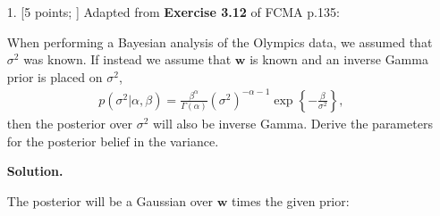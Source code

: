 \documentclass[10pt]{article}
\begin{document}
\begin{itemize}

\item[1.]  [5 points; \boldred{Required only for Graduates}]
Adapted from {\bf Exercise 3.12} of FCMA p.135:

When performing a Bayesian analysis of the Olympics data, we assumed that $\sigma^2$ was known.  If instead we assume that $\mathbf{w}$ is known and an inverse Gamma prior is placed on $\sigma^2$,
\begin{eqnarray*}
p(\sigma^2 | \alpha, \beta) = \frac{\beta^{\alpha}}{\Gamma(\alpha)} (\sigma^2)^{-\alpha-1} \exp \left\{-\frac{\beta}{\sigma^2} \right\},
\end{eqnarray*}
then the posterior over $\sigma^2$ will also be inverse Gamma.  Derive the parameters for the posterior belief in the variance.  


{\bf Solution.}

The posterior will be a Gaussian over $\mathbf{w}$ times the given prior:


\end{itemize}
\end{document}
